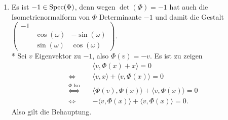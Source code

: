 \begin{enumerate}
	\item Es ist \( -1 \in \text{Spec}(\Phi) \), denn wegen \( \det(\Phi) = -1 \) hat auch die Isometrienormalform von \( \Phi \) Determinante \( -1 \) und damit die Gestalt \( \left( \begin{smallmatrix}
	 		-1 & & \\
	 		& \cos(\omega) & -\sin(\omega) \\
	 		& \sin(\omega) & \cos(\omega)
	 	\end{smallmatrix} \right) \).
	 \\* Sei \( v \) Eigenvektor zu \( -1 \), also \( \Phi(v) = -v \). Es ist zu zeigen
	 \begin{align*}
	 	\quad &\langle v,\Phi(x)+x \rangle = 0 \\
	 	\Leftrightarrow \quad &\langle v,x \rangle + \langle v,\Phi(x) \rangle = 0 \\
	 	\overset{\Phi \text{ Iso}}{\Leftrightarrow} \quad &\langle \Phi(v),\Phi(x) \rangle + \langle v,\Phi(x) \rangle = 0 \\
	 	\Leftrightarrow \quad &-\langle v,\Phi(x) \rangle + \langle v,\Phi(x) \rangle = 0\text{.}
	 \end{align*}
	 Also gilt die Behauptung.


\end{enumerate}
